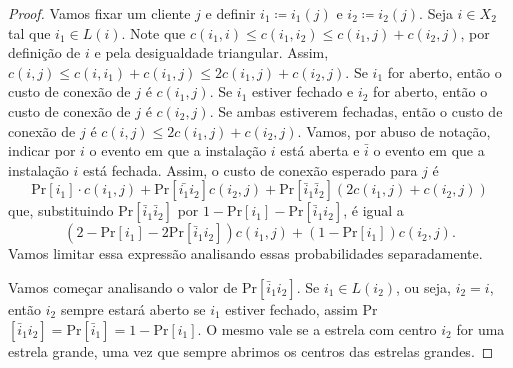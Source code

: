 \begin{proof}
    Vamos fixar um cliente $j$ e definir $i_1 \coloneqq i_1(j)$ e $i_2 \coloneqq i_2(j)$. Seja $i \in X_2$ tal que $i_1 \in L(i)$. Note que $c(i_1,i) \leq c(i_1,i_2) \leq c(i_1,j) + c(i_2,j)$, por definição de $i$ e pela desigualdade triangular. Assim, $c(i,j) \leq c(i,i_1) + c(i_1,j)\leq 2 c(i_1,j) + c(i_2,j)$. Se $i_1$ for aberto, então o custo de conexão de $j$ é $c(i_1,j)$. Se $i_1$ estiver fechado e $i_2$ for aberto, então o custo de conexão de $j$ é $c(i_2,j)$. Se ambas estiverem fechadas, então o custo de conexão de $j$ é $c(i,j) \leq 2c(i_1,j) + c(i_2,j)$. Vamos, por abuso de notação, indicar por $i$ o evento em que a instalação $i$ está aberta e $\bar{i}$ o evento em que a instalação $i$ está fechada. Assim, o custo de conexão esperado para $j$ é 
    \[ \text{Pr}[i_1]\cdot c(i_1,j) + \text{Pr}[\bar{i_1}i_2] c(i_2,j) + \text{Pr}[\bar{i}_1\bar{i}_2] (2c(i_1,j) + c(i_2,j))\] 
    que, substituindo Pr$[\bar{i}_1\bar{i}_2]$ por $1 - \text{Pr}[i_1] - \text{Pr}[\bar{i}_1i_2]$, é igual a
    \begin{equation}
        (2 - \text{Pr}[i_1] - 2 \text{Pr}[\bar{i}_1i_2]) c(i_1,j) + (1 - \text{Pr}[i_1])c(i_2,j).
    \end{equation}
    Vamos limitar essa expressão analisando essas probabilidades separadamente.

    Vamos começar analisando o valor de Pr$[\bar{i}_1i_2]$. Se $i_1 \in L(i_2)$, ou seja, $i_2 = i$, então $i_2$ sempre estará aberto se $i_1$ estiver fechado, assim Pr$[\bar{i}_1i_2] = \text{Pr}[\bar{i}_1] = 1 - \text{Pr}[i_1]$. O mesmo vale se a estrela com centro $i_2$ for uma estrela grande, uma vez que sempre abrimos os centros das estrelas grandes.


\end{proof}
